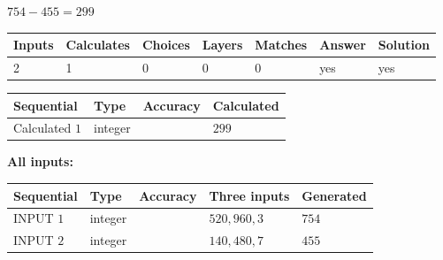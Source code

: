 \documentclass{ctexart}
\begin{document}
 

$ %
754 -  %
455=   %
299$
 
 
\noindent{}
 
 

 
   
   
   
   
\noindent\begin{tabular}{|l|l|l|l|l|l|l|}
 \hline
Inputs & Calculates & Choices & Layers & Matches & Answer & Solution \\ \hline
 2  & 
 1  & 
 0
  & 
 0  & 
 0  & 
  yes & 
  yes 
  \\ \hline
 \end{tabular}
   
   
   
   
\noindent{}
   
   
  
  
\noindent\begin{tabular}{|l|l|l|l|}
\hline
 Sequential & Type & Accuracy & Calculated \\ 
\hline
 
 
  Calculated $  1 $ & integer &  & 
  $ 299 $ 
 \\  \hline  
 \end{tabular}
   
   
   
   
\noindent\vspace{0.1in}\hspace{-0.08in} {\textbf{\Large{All inputs: }}}
   
   
  
  
\noindent\begin{tabular}{|l|l|l|l|l|}
\hline
 Sequential & Type & Accuracy & Three inputs & Generated \\ 
\hline
 
 
  INPUT $  1 $ & integer &  & $
 520
 , 
 960
 , 
 3
 $ & $ 754 $ 
 \\  \hline  
 
 
  INPUT $  2 $ & integer &  & $
 140
 , 
 480
 , 
 7
 $ & $ 455 $ 
 \\  \hline  
 \end{tabular}
   
   
   
   
   
   
 \vspace{0.2in}
 
\end{document}
